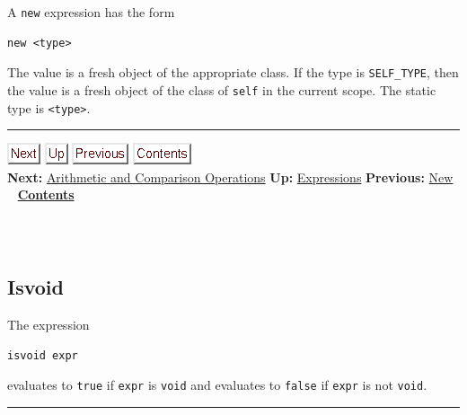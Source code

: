 \documentclass[]{article}
\begin{document}
A \texttt{new} expression has the form

\begin{verbatim}
new <type>
\end{verbatim}

The value is a fresh object of the appropriate class. If the type is
\texttt{SELF\_TYPE}, then the value is a fresh object of the class of
\texttt{self} in the current scope. The static type is
\texttt{\textless{}type\textgreater{}}.

\begin{center}\rule{3in}{0.4pt}\end{center}

\href{node25.html}{\includegraphics{next.png}}
\href{node13.html}{\includegraphics{up.png}}
\href{node23.html}{\includegraphics{prev.png}}
\href{node1.html}{\includegraphics{contents.png}} \\ \textbf{Next:}
\href{node25.html}{Arithmetic and Comparison Operations} \textbf{Up:}
\href{node13.html}{Expressions} \textbf{Previous:}
\href{node23.html}{New} ~ \textbf{\href{node1.html}{Contents}} \\ \\

\subsection{\\ Isvoid}

The expression

\begin{verbatim}
isvoid expr
\end{verbatim}

evaluates to \texttt{true} if \texttt{expr} is \texttt{void} and
evaluates to \texttt{false} if \texttt{expr} is not \texttt{void}.

\begin{center}\rule{3in}{0.4pt}\end{center}
\end{document}

